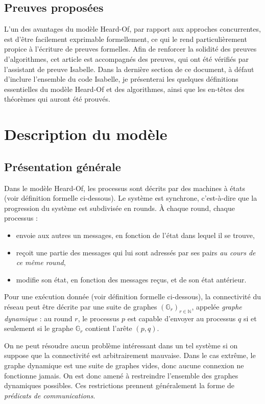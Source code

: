 \documentclass{article}
\begin{document}
\subsection{Preuves proposées}

L'un des avantages du modèle Heard-Of, par rapport aux approches concurrentes, est d'être facilement exprimable formellement, ce qui le rend particulièrement propice à l'écriture de preuves formelles.
Afin de renforcer la solidité des preuves d'algorithmes, cet article est accompagnés des preuves, qui ont été vérifiés par l'assistant de preuve Isabelle.
Dans la dernière section de ce document, à défaut d'inclure l'ensemble du code Isabelle, je présenterai les quelques définitions essentielles du modèle Heard-Of et des algorithmes, ainsi que
les en-têtes des théorèmes qui auront été prouvés.

\section{Description du modèle}

\subsection{Présentation générale}

Dans le modèle Heard-Of, les processus sont décrits par des machines à états (voir définition formelle ci-dessous).
Le système est synchrone, c'est-à-dire que la progression du système est subdivisée en rounds. À chaque round, chaque processus :
\begin{itemize}
	\item envoie aux autres un messages, en fonction de l'état dans lequel il se trouve,
	\item reçoit une partie des messages qui lui sont adressés par ses pairs \emph{au cours de ce même round},
	\item modifie son état, en fonction des messages reçus, et de son état antérieur.
\end{itemize}

Pour une exécution donnée (voir définition formelle ci-dessous), la connectivité du réseau peut être décrite par une suite de graphes $(\mathds{G}_r)_{r \in \mathds{N}}$, appelée \textit{graphe dynamique} :
au round $r$, le processus $p$ est capable d'envoyer au processus $q$ si et seulement si le graphe $\mathds{G}_r$ contient l'arête $(p,q)$.

On ne peut résoudre aucun problème intéressant dans un tel système si on suppose que la connectivité est arbitrairement mauvaise. Dans le cas extrême, le graphe dynamique est une suite de graphes vides, 
donc aucune connexion ne fonctionne jamais.
On est donc amené à restreindre l'ensemble des graphes dynamiques possibles. Ces restrictions prennent généralement la forme de \emph{prédicats de communications}.
\end{document}
